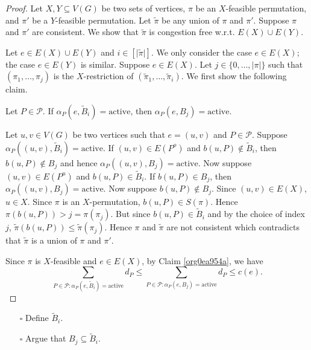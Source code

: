 \documentclass[fontsize=11pt,paper=a4]{book}
\begin{document}
\begin{proof}
Let \(X,Y\subseteq V(G)\) be two sets of vertices, \(\pi\) be an \(X\)-feasible permutation, and \(\pi'\) be a \(Y\)-feasible permutation.
Let \(\tilde{\pi}\) be any union of \(\pi\) and \(\pi'\).
Suppose \(\pi\) and \(\pi'\) are consistent.
We show that \(\tilde{\pi}\) is congestion free w.r.t. \(E(X)\cup E(Y)\).

Let \(e\in E(X)\cup E(Y)\) and \(i\in [\lvert\tilde{\pi}\rvert]\).
We only consider the case \(e\in E(X)\); the case \(e\in E(Y)\) is similar.
Suppose \(e\in E(X)\).
Let \(j\in\{0,\dots,\lvert\pi\rvert\}\) such that \((\pi_1,\dots,\pi_j)\) is the \(X\)-restriction of \((\tilde{\pi}_1,\dots,\tilde{\pi}_i)\).
We first show the following claim.

\begin{claim}
Let \(P\in\mathcal{P}\).
If \(\alpha_P(e,\tilde{B}_i)=\mathrm{active}\), then \(\alpha_P(e,B_j)=\mathrm{active}\).
\label{org0ea954a}
\end{claim}

\begin{proof2}
Let \(u,v\in V(G)\) be two vertices such that \(e=(u,v)\) and \(P\in\mathcal{P}\).
Suppose \(\alpha_P((u,v),\tilde{B}_i)=\mathrm{active}\).
If \((u,v)\in E(P^o)\) and \(b(u,P)\notin\tilde{B}_i\), then \(b(u,P)\notin B_j\) and hence \(\alpha_P((u,v),B_j)=\mathrm{active}\).
Now suppose \((u,v)\in E(P^u)\) and \(b(u,P)\in\tilde{B}_i\).
If \(b(u,P)\in B_j\), then \(\alpha_P((u,v),B_j)=\mathrm{active}\).
Now suppose \(b(u,P)\notin B_j\).
Since \((u,v)\in E(X)\), \(u\in X\).
Since \(\pi\) is an \(X\)-permutation, \(b(u,P)\in S(\pi)\).
Hence \(\pi(b(u,P))>j=\pi(\pi_j)\).
But since \(b(u,P)\in\tilde{B}_i\) and by the choice of index \(j\), \(\tilde{\pi}(b(u,P))\leq\tilde{\pi}(\pi_j)\).
Hence \(\pi\) and \(\tilde{\pi}\) are not consistent which contradicts that \(\tilde{\pi}\) is a union of \(\pi\) and \(\pi'\).
\end{proof2}

Since \(\pi\) is \(X\)-feasible and \(e\in E(X)\), by Claim \ref{org0ea954a}, we have
\[
\sum_{P\in\mathcal{P}:\alpha_P(e,\tilde{B}_i)=\mathrm{active}}d_P\leq\sum_{P\in\mathcal{P}:\alpha_P(e,B_j)=\mathrm{active}}d_P\leq c(e).
\]
\end{proof}

\begin{itemize}
\item[{$\square$}] Define \(\tilde{B}_i\).
\item[{$\square$}] Argue that \(B_j\subseteq\tilde{B}_i\).
\end{itemize}
\end{document}
